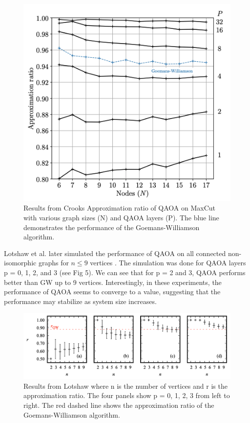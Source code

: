 \begin{figure}[H]
    \centering
    \includegraphics[width=1\linewidth]{images/CrooksResults.png}
    \caption{Results from Crooks \cite{24crooks2018performancequantumapproximateoptimization} Approximation ratio of QAOA on MaxCut with various graph sizes (N) and QAOA layers (P). The blue line demonstrates the performance of the Goemans-Williamson algorithm.}
    \label{fig:4}
\end{figure}

Lotshaw et al. later simulated the performance of QAOA on all connected non-isomorphic graphs for $n \leq 9$ vertices \cite{26Lotshaw_2021}. The simulation was done for QAOA layers p = 0, 1, 2, and 3 (see Fig 5). We can see that for p = 2 and 3, QAOA performs better than GW up to 9 vertices. Interestingly, in these experiments, the performance of QAOA seems to converge to a value, suggesting that the performance may stabilize as system size increases.

\begin{figure}
    \centering
    \includegraphics[width=1\linewidth]{images/lotshawResults.png}
    \caption{Results from Lotshaw \cite{26Lotshaw_2021} where n is the number of vertices and r is the approximation ratio. The four panels show p = 0, 1, 2, 3 from left to right. The red dashed line shows the approximation ratio of the Goemans-Williamson algorithm.}
    \label{fig:enter-label}
\end{figure}

